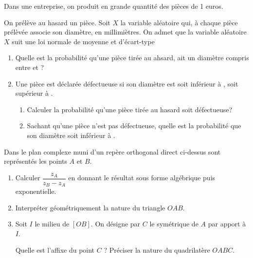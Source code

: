 \begin{question}[topic=probabilité]
  Dans une entreprise, on produit en grande quantité des pièces de 1 euros.

  On prélève au hasard un pièce. Soit $X$ la variable aléatoire qui, à
  chaque pièce prélèvée associe son diamètre, en millimiètres. On admet que
  la variable aléatoire $X$ suit une loi normale de moyenne 
  et d'écart-type 

  \begin{enumerate}
    \item Quelle est la probabilité qu'une pièce tirée au ahsard, ait un
      diamètre compris entre  et  ?
    \item Une pièce est déclarée défectueuse si son diamètre est soit
      inférieur à , soit supérieur à  .
      \begin{enumerate}
        \item Calculer la probabilité qu'une pièce tirée au hasard soit
          défectueuse?
        \item Sachant qu'une pièce n'est pas défectueuse, quelle est la
          probabilité que son diamètre soit inférieur à .
      \end{enumerate}
  \end{enumerate}
\end{question}

\begin{question}[topic=complexes]
  \begin{center}
  \end{center}
  Dans le plan complexe muni d'un repère orthogonal direct ci-dessus sont
  représentés les points $A$ et $B$.

  \begin{enumerate}
    \item Calculer $\dfrac{z_A}{z_B - z_A}$ en donnant le résultat sous
      forme algébrique puis exponentielle.
    \item Interpréter géométriquement la nature du triangle $OAB$.
    \item Soit $I$ le milieu de $[OB]$. On désigne par $C$ le symétrique de
      $A$ par apport à $I$.

      Quelle est l'affixe du point $C$ ? Préciser la nature du quadrilatère
      $OABC$.
  \end{enumerate}
\end{question}

